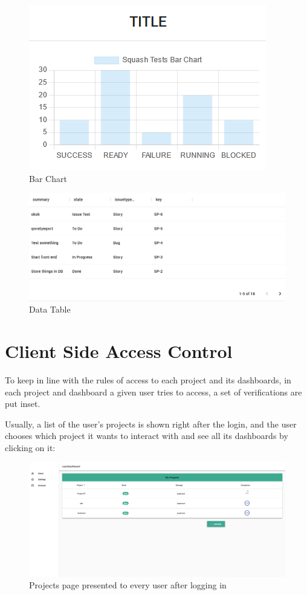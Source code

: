 \documentclass[a4paper,twoside,10pt]{report}
\begin{document}
\newpage

\begin{figure}[h!]
\center
  \includegraphics[]{bar-chart.png}
\caption{Bar Chart}
\end{figure}

\begin{figure}[h!]
\center
  \includegraphics[width=\textwidth]{data-table.png}
\caption{Data Table}
\end{figure}

\section{Client Side Access Control}
To keep in line with the rules of access to each project and its dashboards, in each project and dashboard a given user tries to access, a set of verifications are put inset.

Usually, a list of the user's projects is shown right after the login, and the user chooses which project it wants to interact with and see all its dashboards by clicking on it:
\begin{figure}[h!]
\center
  \includegraphics[width=\textwidth]{projectsPage.png}
\caption{Projects page presented to every user after logging in}
\end{figure}
\end{document}
